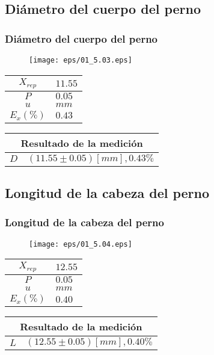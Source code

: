 \documentclass[letter,11pt]{beamer}
\begin{document}
\subsection{Diámetro del cuerpo del perno}
\begin{frame}
\frametitle{Diámetro del cuerpo del perno}
\vspace*{0.8cm}
\begin{figure}
\centering
\texttt{[image: eps/01\_5.03.eps]}
\end{figure}
\vspace*{0.4cm}
\scriptsize
\begin{tabular}{|c|>{\centering}m{1.8cm}<{\centering}|}
\hline
$X_{rep}$ &  $11.55$ \tabularnewline \hline
      $P$ &   $0.05$ \tabularnewline \hline
      $u$ &     $mm$ \tabularnewline \hline
$E_x(\%)$ &   $0.43$ \tabularnewline \hline
\end{tabular}
\quad
\begin{tabular}{|c|>{\centering}m{5.7cm}<{\centering}|}
\hline
\multicolumn{2}{|c|}{\textbf{Resultado de la medición}} \\ \hline
$D$ & $( 11.55\pm0.05)[mm], 0.43\%$ \tabularnewline \hline
\end{tabular}
\end{frame}

\subsection{Longitud de la cabeza del perno}
\begin{frame}
\frametitle{Longitud de la cabeza del perno}
\vspace*{0.8cm}
\begin{figure}
\centering
\texttt{[image: eps/01\_5.04.eps]}
\end{figure}
\vspace*{0.4cm}
\scriptsize
\begin{tabular}{|c|>{\centering}m{1.8cm}<{\centering}|}
\hline
$X_{rep}$ &  $12.55$ \tabularnewline \hline
      $P$ &   $0.05$ \tabularnewline \hline
      $u$ &     $mm$ \tabularnewline \hline
$E_x(\%)$ &   $0.40$ \tabularnewline \hline
\end{tabular}
\quad
\begin{tabular}{|c|>{\centering}m{5.7cm}<{\centering}|}
\hline
\multicolumn{2}{|c|}{\textbf{Resultado de la medición}} \\ \hline
$L$ & $( 12.55\pm0.05)[mm], 0.40\%$ \tabularnewline \hline
\end{tabular}
\end{frame}
\end{document}
